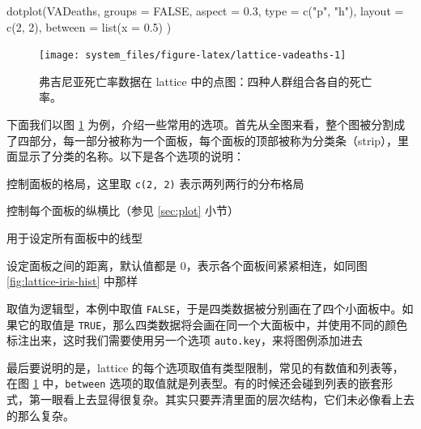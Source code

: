 \documentclass[
  b5paper,
  UTF8,twoside]{book}
\newenvironment{Shaded}{\begin{snugshade}}{\end{snugshade}}
\newcommand{\AttributeTok}[1]{\textcolor[rgb]{0.77,0.63,0.00}{#1}}
\newcommand{\ConstantTok}[1]{\textcolor[rgb]{0.00,0.00,0.00}{#1}}
\newcommand{\DecValTok}[1]{\textcolor[rgb]{0.00,0.00,0.81}{#1}}
\newcommand{\FloatTok}[1]{\textcolor[rgb]{0.00,0.00,0.81}{#1}}
\newcommand{\FunctionTok}[1]{\textcolor[rgb]{0.00,0.00,0.00}{#1}}
\newcommand{\NormalTok}[1]{#1}
\newcommand{\StringTok}[1]{\textcolor[rgb]{0.31,0.60,0.02}{#1}}
\providecommand{\tightlist}{%
  \setlength{\itemsep}{0pt}\setlength{\parskip}{0pt}}
\begin{document}
\begin{Shaded}
\begin{Highlighting}[]
\FunctionTok{dotplot}\NormalTok{(VADeaths,}
  \AttributeTok{groups =} \ConstantTok{FALSE}\NormalTok{, }\AttributeTok{aspect =} \FloatTok{0.3}\NormalTok{, }\AttributeTok{type =} \FunctionTok{c}\NormalTok{(}\StringTok{"p"}\NormalTok{, }\StringTok{"h"}\NormalTok{),}
  \AttributeTok{layout =} \FunctionTok{c}\NormalTok{(}\DecValTok{2}\NormalTok{, }\DecValTok{2}\NormalTok{), }\AttributeTok{between =} \FunctionTok{list}\NormalTok{(}\AttributeTok{x =} \FloatTok{0.5}\NormalTok{)}
\NormalTok{)}
\end{Highlighting}
\end{Shaded}

\begin{figure}

{\centering \texttt{[image: system\_files/figure-latex/lattice-vadeaths-1]} 

}

\caption[弗吉尼亚死亡率数据在 lattice 中的点图]{弗吉尼亚死亡率数据在 lattice 中的点图：四种人群组合各自的死亡率。}\label{fig:lattice-vadeaths}
\end{figure}



下面我们以图 \ref{fig:lattice-vadeaths} 为例，介绍一些常用的选项。首先从全图来看，整个图被分割成了四部分，每一部分被称为一个面板，每个面板的顶部被称为分类条（strip），里面显示了分类的名称。以下是各个选项的说明：

\begin{description}
\tightlist
\item[\texttt{layout}]
控制面板的格局，这里取 \texttt{c(2,\ 2)} 表示两列两行的分布格局
\item[\texttt{aspect}]
控制每个面板的纵横比（参见 \ref{sec:plot} 小节）
\item[\texttt{type}]
用于设定所有面板中的线型
\item[\texttt{between}]
设定面板之间的距离，默认值都是 0，表示各个面板间紧紧相连，如同图 \ref{fig:lattice-iris-hist} 中那样
\item[\texttt{groups}]
取值为逻辑型，本例中取值 \texttt{FALSE}，于是四类数据被分别画在了四个小面板中。如果它的取值是 \texttt{TRUE}，那么四类数据将会画在同一个大面板中，并使用不同的颜色标注出来，这时我们需要使用另一个选项 \texttt{auto.key}，来将图例添加进去
\end{description}

最后要说明的是，lattice 的每个选项取值有类型限制，常见的有数值和列表等，在图 \ref{fig:lattice-vadeaths} 中，\texttt{between} 选项的取值就是列表型。有的时候还会碰到列表的嵌套形式，第一眼看上去显得很复杂。其实只要弄清里面的层次结构，它们未必像看上去的那么复杂。
\end{document}
